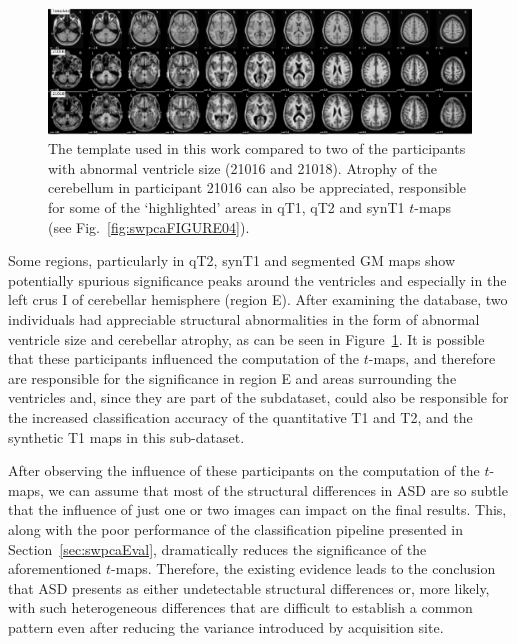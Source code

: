 \begin{figure}
	\centering
	\includegraphics[width=\linewidth]{Graphics/ch7/FIGURE07}
	\caption[The template used in this work compared to two of the participants with abnormal ventricle size (21016 and 21018).]{The template used in this work compared to two of the participants with abnormal ventricle size (21016 and 21018). Atrophy of the cerebellum in participant 21016 can also be appreciated, responsible for some of the `highlighted' areas in \acs{qT1}, \acs{qT2} and \ac{synT1} $t$-maps (see Fig.~\ref{fig:swpcaFIGURE04}).}
	\label{fig:swpcaFIGURE07}
\end{figure}

Some regions, particularly in \ac{qT2}, \ac{synT1} and segmented \ac{GM} maps show potentially spurious significance peaks around the ventricles and especially in the left crus I of cerebellar hemisphere (region E). After examining the database, two individuals had appreciable structural abnormalities in the form of abnormal ventricle size and cerebellar atrophy, as can be seen in Figure~\ref{fig:swpcaFIGURE07}. It is possible that these participants influenced the computation of the $t$-maps, and therefore are responsible for the significance in region E and areas surrounding the ventricles and, since they are part of the \lon{} subdataset, could also be responsible for the increased classification accuracy of the quantitative T1 and T2, and the synthetic T1 maps in this sub-dataset.

After observing the influence of these participants on the computation of the $t$-maps, we can assume that most of the structural differences in \ac{ASD} are so subtle that the influence of just one or two images can impact on the final results. This, along with the poor performance of the classification pipeline presented in Section~\ref{sec:swpcaEval}, dramatically reduces the significance of the aforementioned $t$-maps. Therefore, the existing evidence leads to the conclusion that \ac{ASD} presents as either undetectable structural differences or, more likely, with such heterogeneous differences that are difficult to establish a common pattern even after reducing the variance introduced by acquisition site. 

